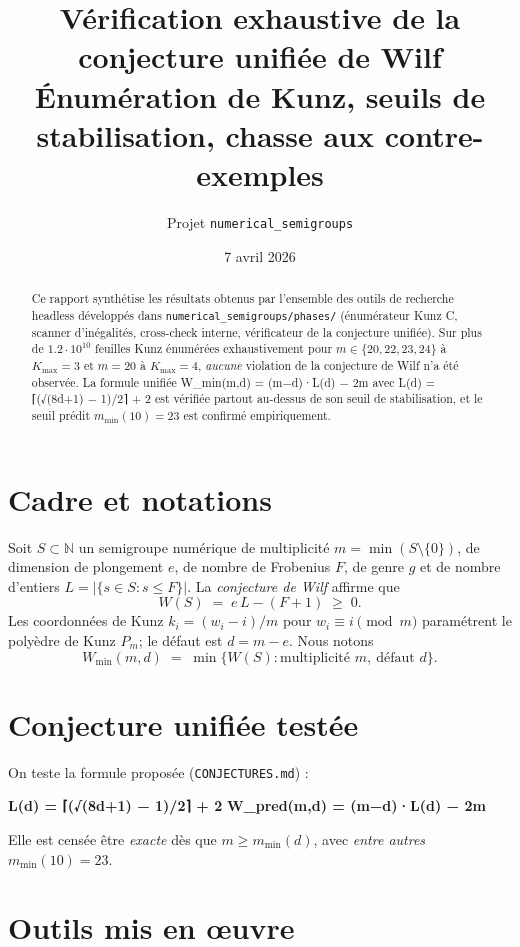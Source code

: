 \documentclass[11pt,a4paper]{article}
\title{Vérification exhaustive de la conjecture unifiée de Wilf\\
\large Énumération de Kunz, seuils de stabilisation, chasse aux contre-exemples}
\author{Projet \texttt{numerical\_semigroups}}
\date{7 avril 2026}
\begin{document}
\maketitle

\begin{abstract}
Ce rapport synthétise les résultats obtenus par l'ensemble des outils
de recherche headless développés dans \texttt{numerical\_semigroups/phases/}
(énumérateur Kunz C, scanner d'inégalités, cross-check interne, vérificateur
de la conjecture unifiée). Sur plus de $1.2\cdot 10^{10}$ feuilles Kunz énumérées
exhaustivement pour $m\in\{20,22,23,24\}$ à $K_{\max}=3$ et $m=20$ à $K_{\max}=4$,
\emph{aucune} violation de la conjecture de Wilf n'a été observée.
La formule unifiée W\_min(m,d) = (m−d)·L(d) − 2m avec
L(d) = ⌈(√(8d+1) − 1)/2⌉ + 2 est vérifiée partout au-dessus
de son seuil de stabilisation, et le seuil prédit $m_{\min}(10)=23$
est confirmé empiriquement.
\end{abstract}

\section{Cadre et notations}

Soit $S\subset\mathbb{N}$ un semigroupe numérique de multiplicité $m=\min(S\setminus\{0\})$,
de dimension de plongement $e$, de nombre de Frobenius $F$, de genre $g$
et de nombre d'entiers $L=|\{s\in S:s\le F\}|$. La \emph{conjecture de Wilf}
affirme que
\[
  W(S)\;=\;e\,L-(F+1)\;\ge\;0.
\]
Les coordonnées de Kunz $k_i=(w_i-i)/m$ pour $w_i\equiv i\pmod{m}$ paramétrent
le polyèdre de Kunz $P_m$; le défaut est $d=m-e$. Nous notons
\[
  W_{\min}(m,d)\;=\;\min\{W(S):\text{multiplicité }m,\ \text{défaut }d\}.
\]

\section{Conjecture unifiée testée}

On teste la formule proposée (\texttt{CONJECTURES.md}) :
\begin{center}
\textbf{L(d) = ⌈(√(8d+1) − 1)/2⌉ + 2}\qquad
\textbf{W\_pred(m,d) = (m−d)·L(d) − 2m}
\end{center}
Elle est censée être \emph{exacte} dès que $m\ge m_{\min}(d)$, avec
\emph{entre autres} $m_{\min}(10)=23$.

\section{Outils mis en œuvre}
\end{document}
